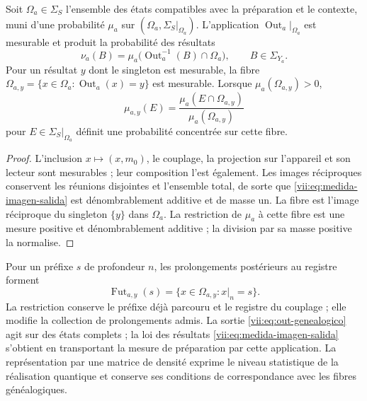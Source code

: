 \begin{proposition}
\label{vii:prop:medida-salida}
Soit \(\Omega_a\in\Sigma_S\) l’ensemble des états compatibles avec la
préparation et le contexte, muni d’une probabilité \(\mu_a\) sur
\((\Omega_a,\Sigma_S|_{\Omega_a})\).
L’application \(\operatorname{Out}_a|_{\Omega_a}\) est mesurable et produit
la probabilité des résultats
\begin{equation}
 \nu_a(B)=\mu_a\bigl(\operatorname{Out}_a^{-1}(B)\cap\Omega_a\bigr),
 \qquad B\in\Sigma_{Y_a}.
 \label{vii:eq:medida-imagen-salida}
\end{equation}
Pour un résultat \(y\) dont le singleton est mesurable, la fibre \(\Omega_{a,y}=\{x\in\Omega_a:\operatorname{Out}_a(x)=y\}\) est mesurable. Lorsque \(\mu_a(\Omega_{a,y})>0\),
\begin{equation}
 \mu_{a,y}(E)=
 \frac{\mu_a(E\cap\Omega_{a,y})}{\mu_a(\Omega_{a,y})}
 \label{vii:eq:condicionamiento-salida}
\end{equation}
pour \(E\in\Sigma_S|_{\Omega_a}\) définit une probabilité concentrée
sur cette fibre.
\end{proposition}
\begin{proof}
L'inclusion \(x\mapsto(x,m_0)\), le couplage, la projection sur l'appareil et son lecteur sont mesurables ; leur composition l'est également. Les images réciproques conservent les réunions disjointes et l'ensemble total, de sorte que \eqref{vii:eq:medida-imagen-salida} est dénombrablement additive et de masse un. La fibre est l'image réciproque du singleton \(\{y\}\) dans \(\Omega_a\). La restriction de \(\mu_a\) à cette fibre est une mesure positive et dénombrablement additive ; la division par sa masse positive la normalise.
\end{proof}

Pour un préfixe \(s\) de profondeur \(n\), les prolongements postérieurs
au registre forment
\[
 \operatorname{Fut}_{a,y}(s)
 =\{x\in\Omega_{a,y}:x|_n=s\}.
\]
La restriction conserve le préfixe déjà parcouru et le registre du
couplage ; elle modifie la collection de prolongements admis. La sortie
\eqref{vii:eq:out-genealogico} agit sur des états complets ; la loi des
résultats \eqref{vii:eq:medida-imagen-salida} s’obtient en transportant
la mesure de préparation par cette application. La représentation par une
matrice de densité exprime le niveau
statistique de la réalisation quantique et conserve ses conditions de
correspondance avec les fibres généalogiques.
